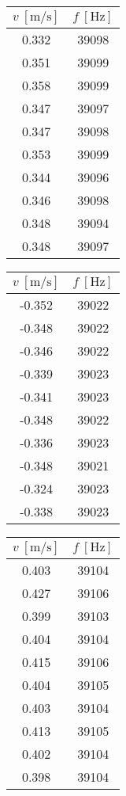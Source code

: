 \documentclass[a4paper,10pt]{article}
\begin{document}
\begin{table}[H]
    \centering
    \begin{minipage}{0.32\textwidth}
     \centering
     \begin{tabular}{|c|c|}
        $v\ [\si{\meter\per\second}]$ & $f\ [\si{\hertz}]$ \\ \hline
        0.332 & 39098 \\
        0.351 & 39099 \\
        0.358 & 39099 \\
        0.347 & 39097 \\
        0.347 & 39098 \\
        0.353 & 39099 \\
        0.344 & 39096 \\
        0.346 & 39098 \\
        0.348 & 39094 \\
        0.348 & 39097 \\
     \end{tabular}
    \end{minipage}
    \begin{minipage}{0.32\textwidth}
     \centering
     \begin{tabular}{|c|c|}
        $v\ [\si{\meter\per\second}]$ & $f\ [\si{\hertz}]$ \\ \hline
        -0.352 & 39022 \\
        -0.348 & 39022 \\
        -0.346 & 39022 \\
        -0.339 & 39023 \\
        -0.341 & 39023 \\
        -0.348 & 39022 \\
        -0.336 & 39023 \\
        -0.348 & 39021 \\
        -0.324 & 39023 \\
        -0.338 & 39023 \\
     \end{tabular}
    \end{minipage}
    \begin{minipage}{0.32\textwidth}
     \centering
     \begin{tabular}{|c|c|}
        $v\ [\si{\meter\per\second}]$ & $f\ [\si{\hertz}]$ \\ \hline
        0.403 & 39104 \\
        0.427 & 39106 \\
        0.399 & 39103 \\
        0.404 & 39104 \\
        0.415 & 39106 \\
        0.404 & 39105 \\
        0.403 & 39104 \\
        0.413 & 39105 \\
        0.402 & 39104 \\
        0.398 & 39104 \\
     \end{tabular}
    \end{minipage}
\end{table}
\end{document}
